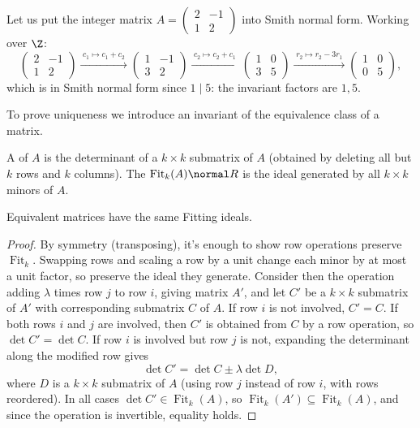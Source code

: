 \begin{example}
	Let us put the integer matrix $A = \begin{pmatrix} 2 & -1 \\ 1 & 2\end{pmatrix}$ into Smith normal form. Working over $\Z$:
	$$
	\begin{pmatrix} 2 & -1 \\ 1 & 2	\end{pmatrix}
	\xrightarrow{\;c_1 \mapsto c_1 + c_2\;}
	\begin{pmatrix} 1 & -1 \\ 3 & 2	\end{pmatrix}
	\xrightarrow{\;c_2 \mapsto c_2 + c_1\;}
	\begin{pmatrix} 1 & 0 \\ 3 & 5	\end{pmatrix}
	\xrightarrow{\;r_2 \mapsto r_2 - 3r_1\;}
	\begin{pmatrix} 1 & 0 \\ 0 & 5	\end{pmatrix},
	$$
	which is in Smith normal form since $1 \mid 5$: the invariant factors are $1, 5$.
\end{example}

To prove uniqueness we introduce an invariant of the equivalence class of a matrix.

\begin{definition}
	A  of $A$ is the determinant of a $k \times k$ submatrix of $A$ (obtained by deleting all but $k$ rows and $k$ columns). The  $\operatorname{Fit}_k(A) \normal R$ is the ideal generated by all $k \times k$ minors of $A$.
\end{definition}

\begin{lemma}
	Equivalent matrices have the same Fitting ideals.
\end{lemma}
\begin{proof}
	By symmetry (transposing), it's enough to show row operations preserve $\operatorname{Fit}_k$. Swapping rows and scaling a row by a unit change each minor by at most a unit factor, so preserve the ideal they generate. Consider then the operation adding $\lambda$ times row $j$ to row $i$, giving matrix $A'$, and let $C'$ be a $k \times k$ submatrix of $A'$ with corresponding submatrix $C$ of $A$. If row $i$ is not involved, $C' = C$. If both rows $i$ and $j$ are involved, then $C'$ is obtained from $C$ by a row operation, so $\det C' = \det C$. If row $i$ is involved but row $j$ is not, expanding the determinant along the modified row gives
	$$
	\det C' = \det C \pm \lambda \det D,
	$$
	where $D$ is a $k \times k$ submatrix of $A$ (using row $j$ instead of row $i$, with rows reordered). In all cases $\det C' \in \operatorname{Fit}_k(A)$, so $\operatorname{Fit}_k(A') \subseteq \operatorname{Fit}_k(A)$, and since the operation is invertible, equality holds.
\end{proof}

